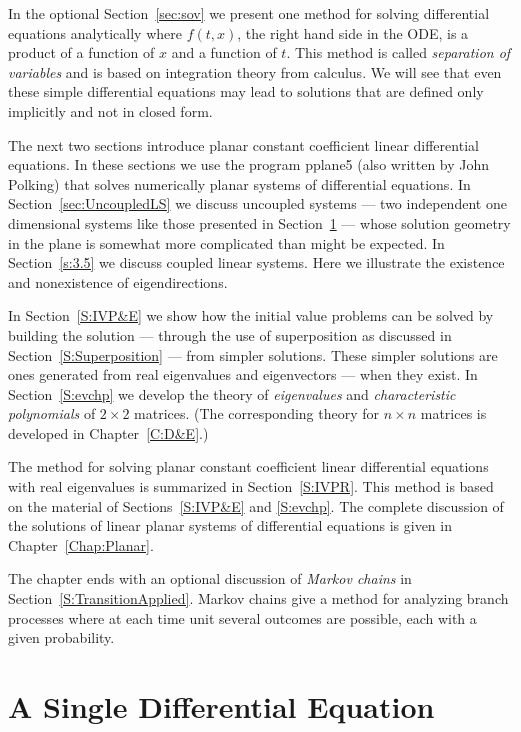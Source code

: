 \documentclass{ximera}
\begin{document}
In the optional Section~\ref{sec:sov} we present one method for solving
differential equations analytically where $f(t,x)$, the right hand side in 
the ODE, is a product of a function of $x$ and a function of $t$. This method 
is called {\em separation of variables} and is based on integration theory
from calculus.  We will see that even these simple differential
equations may lead to solutions that are defined only implicitly and not in
closed form.

The next two sections introduce planar constant coefficient linear
differential equations.  In these sections we use the program {\sf pplane5}
(also written by John Polking) that solves numerically planar systems of
differential equations.  In Section~\ref{sec:UncoupledLS} we discuss 
uncoupled systems --- two independent one dimensional systems like those 
presented in Section~\ref{S:growthmodels} --- whose solution geometry in the 
plane is somewhat more complicated than might be expected.  In 
Section~\ref{s:3.5} we discuss coupled linear systems.  Here we
illustrate the existence and nonexistence of eigendirections.

In Section~\ref{S:IVP&E} we show how the initial value problems can be solved 
by building the solution --- through the use of superposition as discussed in 
Section~\ref{S:Superposition} --- from simpler solutions.  These simpler
solutions are ones generated from real eigenvalues and eigenvectors
--- when they exist.  In Section~\ref{S:evchp} we develop the theory of  
{\em eigenvalues\/} and {\em characteristic polynomials\/} of $2\times 2$ 
matrices.  (The corresponding theory for $n\times n$ matrices is developed in 
Chapter~\ref{C:D&E}.)

The method for solving planar constant coefficient linear differential 
equations with real eigenvalues is summarized in Section~\ref{S:IVPR}.  This 
method is based on the material of Sections~\ref{S:IVP&E} and \ref{S:evchp}.  
The complete discussion of the solutions of linear planar systems of 
differential equations is given in Chapter~\ref{Chap:Planar}.

The chapter ends with an optional discussion of {\em Markov chains\/} in 
Section~\ref{S:TransitionApplied}.  Markov chains give a method for 
analyzing branch processes where at each time unit several outcomes are 
possible, each with a given probability.

\section{A Single Differential Equation}  \label{S:growthmodels}
\end{document}
